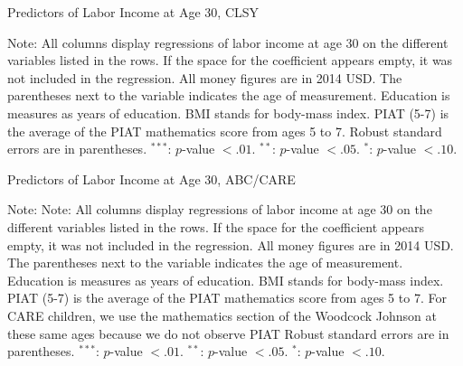 \begin{table}[H] 
\begin{threeparttable}
\caption{Predictors of Labor Income at Age 30, CLSY}
\label{table:predcnlsy}
\centering 

\begin{tablenotes}
\footnotesize
\item Note: All columns display regressions of labor income at age 30 on the different variables listed in the rows. If the space for the coefficient appears empty, it was not included in the regression. All money figures are in 2014 USD. The parentheses next to the variable indicates the age of measurement. Education is measures as years of education. BMI stands for body-mass index. PIAT (5-7) is the average of the PIAT mathematics score from ages 5 to 7. Robust standard errors are in parentheses. $^{***}$: $p$-value $< .01$. $^{**}$: $p$-value $< .05$. $^{*}$: $p$-value $< .10$.
\end{tablenotes}
\end{threeparttable}
\end{table}

\begin{table}[H] 
\begin{threeparttable}
\caption{Predictors of Labor Income at Age 30, ABC/CARE}
\label{table:predabc}
\centering 

\begin{tablenotes}
\footnotesize
\item Note: Note: All columns display regressions of labor income at age 30 on the different variables listed in the rows. If the space for the coefficient appears empty, it was not included in the regression. All money figures are in 2014 USD. The parentheses next to the variable indicates the age of measurement. Education is measures as years of education. BMI stands for body-mass index. PIAT (5-7) is the average of the PIAT mathematics score from ages 5 to 7. For CARE children, we use the mathematics section of the Woodcock Johnson at these same ages because we do not observe PIAT Robust standard errors are in parentheses. $^{***}$: $p$-value $< .01$. $^{**}$: $p$-value $< .05$. $^{*}$: $p$-value $< .10$.
\end{tablenotes}
\end{threeparttable}
\end{table}


